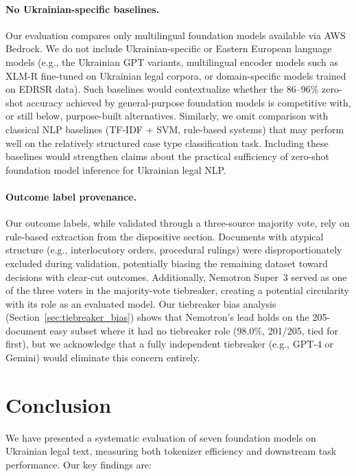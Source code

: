 \documentclass[11pt,a4paper]{article}
\begin{document}
\paragraph{No Ukrainian-specific baselines.} Our evaluation compares only multilingual foundation models available via AWS Bedrock. We do not include Ukrainian-specific or Eastern European language models (e.g., the Ukrainian GPT variants, multilingual encoder models such as XLM-R fine-tuned on Ukrainian legal corpora, or domain-specific models trained on EDRSR data). Such baselines would contextualize whether the 86--96\% zero-shot accuracy achieved by general-purpose foundation models is competitive with, or still below, purpose-built alternatives. Similarly, we omit comparison with classical NLP baselines (TF-IDF + SVM, rule-based systems) that may perform well on the relatively structured case type classification task. Including these baselines would strengthen claims about the practical sufficiency of zero-shot foundation model inference for Ukrainian legal NLP.

\paragraph{Outcome label provenance.} Our outcome labels, while validated through a three-source majority vote, rely on rule-based extraction from the dispositive section. Documents with atypical structure (e.g., interlocutory orders, procedural rulings) were disproportionately excluded during validation, potentially biasing the remaining dataset toward decisions with clear-cut outcomes. Additionally, Nemotron Super~3 served as one of the three voters in the majority-vote tiebreaker, creating a potential circularity with its role as an evaluated model. Our tiebreaker bias analysis (Section~\ref{sec:tiebreaker_bias}) shows that Nemotron's lead holds on the 205-document easy subset where it had no tiebreaker role (98.0\%, 201/205, tied for first), but we acknowledge that a fully independent tiebreaker (e.g., GPT-4 or Gemini) would eliminate this concern entirely.

\section{Conclusion}

We have presented a systematic evaluation of seven foundation models on Ukrainian legal text, measuring both tokenizer efficiency and downstream task performance. Our key findings are:
\end{document}

